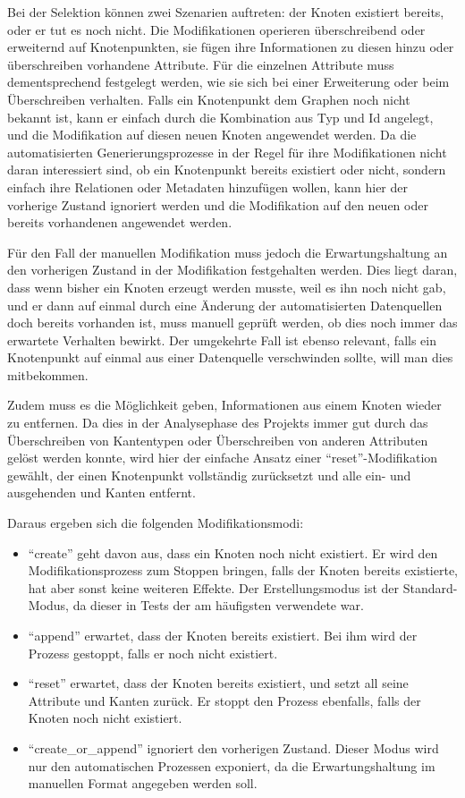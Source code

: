 Bei der Selektion können zwei Szenarien auftreten: der Knoten existiert bereits, oder er tut es noch nicht.
Die Modifikationen operieren überschreibend oder erweiternd auf Knotenpunkten, sie fügen ihre Informationen zu diesen hinzu oder überschreiben vorhandene Attribute.
Für die einzelnen Attribute muss dementsprechend festgelegt werden, wie sie sich bei einer Erweiterung oder beim Überschreiben verhalten.
Falls ein Knotenpunkt dem Graphen noch nicht bekannt ist, kann er einfach durch die Kombination aus Typ und Id angelegt, und die Modifikation auf diesen neuen Knoten angewendet werden.
Da die automatisierten Generierungsprozesse in der Regel für ihre Modifikationen nicht daran interessiert sind, ob ein Knotenpunkt bereits existiert oder nicht, sondern einfach ihre Relationen oder Metadaten hinzufügen wollen, kann hier der vorherige Zustand ignoriert werden und die Modifikation auf den neuen oder bereits vorhandenen angewendet werden.

Für den Fall der manuellen Modifikation muss jedoch die Erwartungshaltung an den vorherigen Zustand in der Modifikation festgehalten werden.
Dies liegt daran, dass wenn bisher ein Knoten erzeugt werden musste, weil es ihn noch nicht gab, und er dann auf einmal durch eine Änderung der automatisierten Datenquellen doch bereits vorhanden ist, muss manuell geprüft werden, ob dies noch immer das erwartete Verhalten bewirkt.
Der umgekehrte Fall ist ebenso relevant, falls ein Knotenpunkt auf einmal aus einer Datenquelle verschwinden sollte, will man dies mitbekommen.

Zudem muss es die Möglichkeit geben, Informationen aus einem Knoten wieder zu entfernen.
Da dies in der Analysephase des Projekts immer gut durch das Überschreiben von Kantentypen oder Überschreiben von anderen Attributen gelöst werden konnte, wird hier der einfache Ansatz einer \enquote{reset}-Modifikation gewählt, der einen Knotenpunkt vollständig zurücksetzt und alle ein- und ausgehenden und Kanten entfernt.

Daraus ergeben sich die folgenden Modifikationsmodi:

\begin{itemize}
    \itemsep0em
    \item \enquote{create} geht davon aus, dass ein Knoten noch nicht existiert.
    Er wird den Modifikationsprozess zum Stoppen bringen, falls der Knoten bereits existierte, hat aber sonst keine weiteren Effekte.
    Der Erstellungsmodus ist der Standard-Modus, da dieser in Tests der am häufigsten verwendete war.
    \item \enquote{append} erwartet, dass der Knoten bereits existiert.
    Bei ihm wird der Prozess gestoppt, falls er noch nicht existiert.
    \item \enquote{reset} erwartet, dass der Knoten bereits existiert, und setzt all seine Attribute und Kanten zurück.
    Er stoppt den Prozess ebenfalls, falls der Knoten noch nicht existiert.
    \item \enquote{create\_or\_append} ignoriert den vorherigen Zustand.
    Dieser Modus wird nur den automatischen Prozessen exponiert, da die Erwartungshaltung im manuellen Format angegeben werden soll.
\end{itemize}

